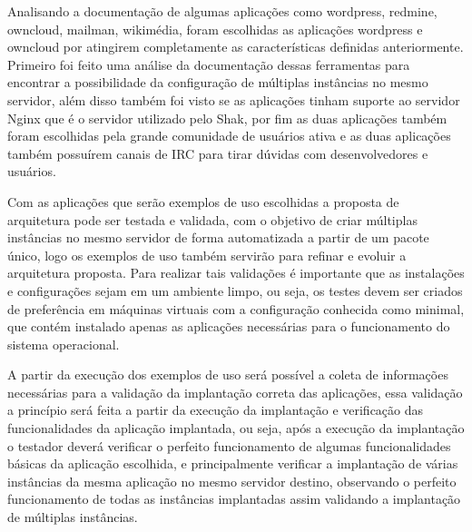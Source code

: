 Analisando a documentação de algumas aplicações como wordpress, redmine,
owncloud, mailman, wikimédia, foram escolhidas as aplicações wordpress e owncloud por
atingirem completamente as características definidas anteriormente. Primeiro
foi feito uma análise da documentação dessas ferramentas para encontrar a
possibilidade da configuração de múltiplas instâncias no mesmo servidor, além
disso também foi visto se as aplicações tinham suporte ao servidor Nginx que é
o servidor utilizado pelo Shak, por fim as duas aplicações também foram escolhidas
pela grande comunidade de usuários ativa e as duas aplicações também possuírem
canais de IRC para tirar dúvidas com desenvolvedores e usuários.

Com as aplicações que serão exemplos de uso escolhidas a proposta de arquitetura
pode ser testada e validada, com o objetivo de criar múltiplas instâncias
no mesmo servidor de forma automatizada a partir de um pacote único, logo os
exemplos de uso também servirão para refinar e evoluir a arquitetura proposta.
Para realizar tais validações é importante que as instalações e configurações
sejam em um ambiente limpo, ou seja, os testes devem ser criados de preferência
em máquinas virtuais com a configuração conhecida como minimal, que contém
instalado apenas as aplicações necessárias para o funcionamento do sistema operacional.

A partir da execução dos exemplos de uso será possível a coleta de informações
necessárias para a validação da implantação correta das aplicações, essa
validação a princípio será feita a partir da execução da implantação e
verificação das funcionalidades da aplicação implantada, ou seja,
após a execução da implantação o testador deverá verificar o perfeito
funcionamento de algumas funcionalidades básicas da aplicação escolhida,
e principalmente verificar a implantação de várias instâncias da mesma
aplicação no mesmo servidor destino, observando o perfeito funcionamento de todas as
instâncias implantadas assim validando a implantação de múltiplas instâncias.
